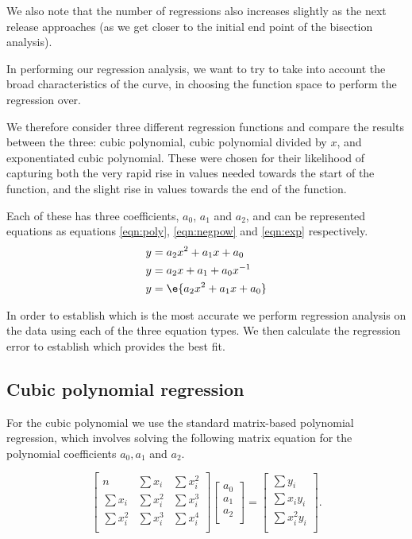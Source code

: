 \documentclass[10pt,journal,compsoc]{IEEEtran}
\begin{document}
We also note that the number of regressions also increases slightly as the next release approaches (\ie as we get closer to the initial end point of the bisection analysis).

In performing our regression analysis, we want to try to take into account the broad characteristics of the curve, in choosing the function space to perform the regression over.

We therefore consider three different regression functions and compare the results between the three: cubic polynomial, cubic polynomial divided by $x$, and exponentiated cubic polynomial. These were chosen for their likelihood of capturing both the very rapid rise in values needed towards the start of the function, and the slight rise in values towards the end of the function.

Each of these has three coefficients, $a_0$, $a_1$ and $a_2$, and can be represented equations as equations \ref{eqn:poly}, \ref{eqn:negpow} and \ref{eqn:exp} respectively.
\begin{align}
y &= a_2 x^2 + a_1 x + a_0 \label{eqn:poly} \\
y &= a_2 x + a_1 + a_0 x^{-1} \label{eqn:negpow} \\
y &= \e{a_2 x^2 + a_1 x + a_0} \label{eqn:exp}
\end{align}

In order to establish which is the most accurate we perform regression analysis on the data using each of the three equation types. We then calculate the regression error to establish which provides the best fit.

\subsection{Cubic polynomial regression}

For the cubic polynomial we use the standard matrix-based polynomial regression, which involves solving the following matrix equation for the polynomial coefficients $a_0, a_1$ and $a_2$.

\begin{equation}
\begin{bmatrix}
n          & \sum x_i   & \sum x_i^2 \\
\sum x_i   & \sum x_i^2 & \sum x_i^3 \\
\sum x_i^2 & \sum x_i^3 & \sum x_i^4 \\
\end{bmatrix}
\begin{bmatrix}
a_0 \\
a_1 \\
a_2 \\
\end{bmatrix}
=
\begin{bmatrix}
\sum y_i \phantom{x_i} \\
\sum x_i y_i           \\
\sum x_i^2 y_i         \\
\end{bmatrix}.
\end{equation}
\end{document}

